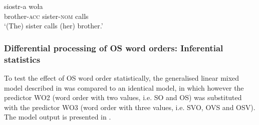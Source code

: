 \ea%
    \label{ex:05:3}
         {siostr-a}   {woła}\\
            brother-\textsc{acc}  sister-\textsc{nom}  calls\\
    \glt    `(The) sister calls (her) brother.'
    \z

\subsubsection{Differential processing of OS word orders: Inferential statistics}\label{sec:05:2.5.1}

To test the effect of OS word order statistically, the generalised linear mixed model described in  was compared to an identical model, in which however the predictor WO2 (word order with two values, i.e. SO and OS) was substituted with the predictor WO3 (word order with three values, i.e. SVO, OVS and OSV). The model output is presented in .

